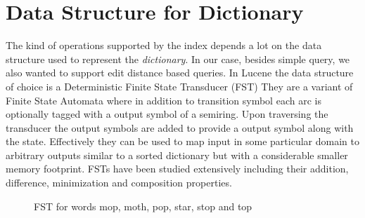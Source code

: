 \section{Data Structure for Dictionary}
The kind of operations supported by the index depends a lot on the data structure used to represent the \textit{dictionary}.
In our case, besides simple query, we also wanted to support edit distance based queries.
In Lucene\cite{mccandless2012fst} the data structure of choice is a Deterministic Finite State Transducer\cite{mohri2004weighted} (FST)
They are a variant of Finite State Automata where in addition to transition symbol each arc is optionally tagged with a output symbol of a semiring.
Upon traversing the transducer the output symbols are added to provide a output symbol along with the state.
Effectively they can be used to map input in some particular domain to arbitrary outputs similar to a sorted dictionary but with a considerable smaller memory footprint.
FSTs have been studied extensively including their addition, difference, minimization and composition properties.

\begin{figure}
\caption{FST for words mop, moth, pop, star, stop and top}
\end{figure}

